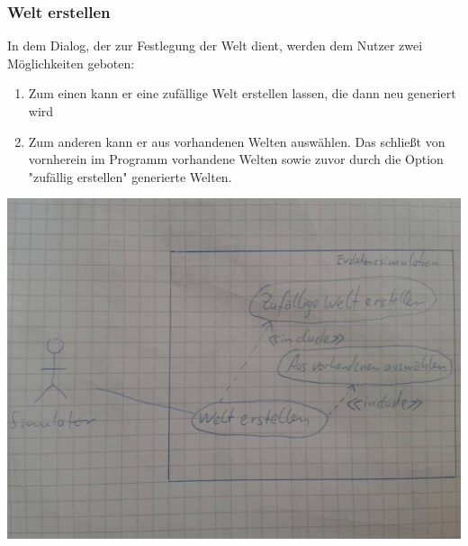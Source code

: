\documentclass[a4paper, 10pt]{article}
\begin{document}
\subsubsection{Welt erstellen}
In dem Dialog, der zur Festlegung der Welt dient, werden dem Nutzer zwei Möglichkeiten geboten:
\begin{enumerate}
\item Zum einen kann er eine zufällige Welt erstellen lassen, die dann neu generiert wird
\item Zum anderen kann er aus vorhandenen Welten auswählen. Das schließt von vornherein im Programm vorhandene Welten sowie zuvor durch die Option "zufällig erstellen" generierte Welten.
\end{enumerate}
\begin{minipage}{100mm} 
\includegraphics[scale=0.18]{Bilder/UC_WeltWestellen.jpg}
\end{minipage}
\newpage
\end{document}
